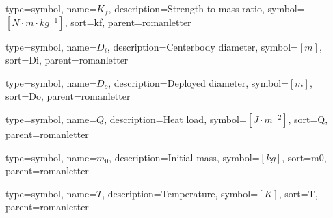 {
type=symbol, %
name={\ensuremath{K_f}}, %
description={Strength to mass ratio}, %
symbol={$\left[N \cdot m \cdot kg^{-1} \right]$}, %
sort=kf, %
parent=romanletter %
}

{
type=symbol, %
name={\ensuremath{D_i}}, %
description={Centerbody diameter}, %
symbol={$\left[m \right]$}, %
sort=Di, %
parent=romanletter %
}

{
type=symbol, %
name={\ensuremath{D_o}}, %
description={Deployed diameter}, %
symbol={$\left[m \right]$}, %
sort=Do, %
parent=romanletter %
}

{
type=symbol, %
name={\ensuremath{Q}}, %
description={Heat load}, %
symbol={$\left[J\cdot m^{-2} \right]$}, %
sort=Q, %
parent=romanletter %
}

{
type=symbol, %
name={\ensuremath{m_0}}, %
description={Initial mass}, %
symbol={$\left[kg \right]$}, %
sort=m0, %
parent=romanletter %
}


{
	type=symbol, %
	name={\ensuremath{T}}, %
	description={Temperature}, %
	symbol={$\left[K\right]$}, %
	sort=T, %
	parent=romanletter %
}

